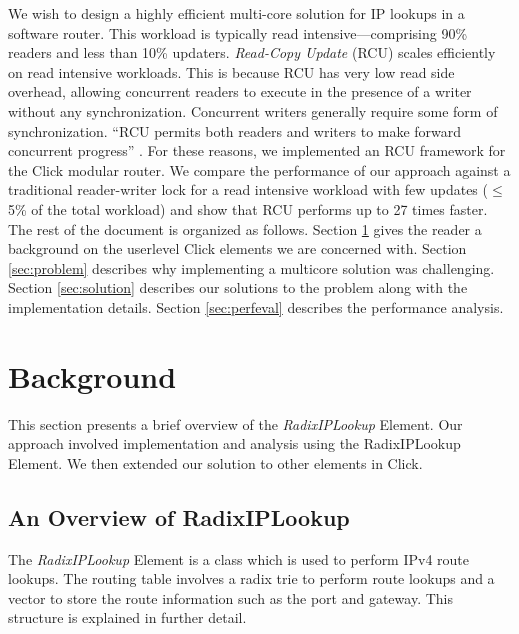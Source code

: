 \documentclass[a4paper]{article}
\begin{document}
We wish to design a highly efficient multi-core solution for IP lookups in a software router. This workload is typically read intensive---comprising 90\% readers and less than 10\% updaters. \emph{Read-Copy Update} (RCU) \cite{readcopyupdate} scales efficiently on read intensive workloads. This is because RCU has very low read side overhead, allowing concurrent readers to execute in the presence of a writer without any synchronization. Concurrent writers generally require some form of synchronization. ``RCU permits both readers and writers to make forward concurrent progress'' \cite{urcu}. For these reasons, we implemented an RCU framework for the Click modular router. We compare the performance of our approach against a traditional reader-writer lock for a read intensive workload with few updates ($\le$ 5\% of the total workload) and show that RCU performs up to 27 times faster.\\

The rest of the document is organized as follows. Section \ref{sec:background} gives the reader a background on the userlevel Click elements we are concerned with. Section \ref{sec:problem} describes why implementing a multicore solution was challenging. Section \ref{sec:solution} describes our solutions to the problem along with the implementation details. Section \ref{sec:perfeval} describes the performance analysis.
\section{Background}
\label{sec:background}
This section presents a brief overview of the \emph{RadixIPLookup} Element. Our approach involved implementation and analysis using the RadixIPLookup Element. We then extended our solution to other elements in Click. 
\subsection{An Overview of RadixIPLookup}
The \emph{RadixIPLookup} Element \cite{radixiplookup} is a class which is used to perform IPv4 route lookups. The routing table involves a radix trie to perform route lookups and a vector to store the route information such as the port and gateway. This structure is explained in further detail. 
\end{document}
